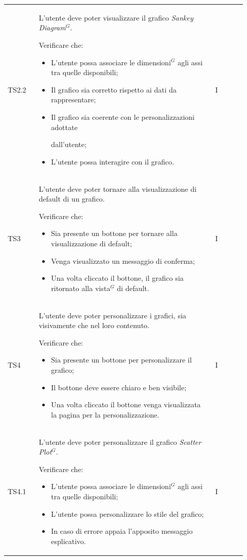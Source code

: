 \begin{longtable}{p{0.12\linewidth}p{0.68\linewidth}p{0.12\linewidth}}
    \rowcolor[RGB]{216, 235, 171}
    TS2.2 &
    L'utente deve poter visualizzare il grafico \textit{Sankey Diagram}$^{G}$.
    \par Verificare che:
    \begin{itemize}
        \item L'utente possa associare le dimensioni$^{G}$ agli assi tra quelle disponibili;
        \item Il grafico sia corretto rispetto ai dati da rappresentare;
        \item Il grafico sia coerente con le personalizzazioni adottate \par dall'utente;
        \item L'utente possa interagire con il grafico.
    \end{itemize}&
    I\\

    \rowcolor[RGB]{233, 245, 206}
    TS3 & 
    L'utente deve poter tornare alla visualizzazione di default di un grafico. \par 
    Verificare che:
    \begin{itemize}
        \item Sia presente un bottone per tornare alla visualizzazione di default;
        \item Venga visualizzato un messaggio di conferma;
        \item Una volta cliccato il bottone, il grafico sia ritornato alla vista$^{G}$ di default.
    \end{itemize}&
    I\\

    \rowcolor[RGB]{216, 235, 171}
    TS4 &
    L'utente deve poter personalizzare i grafici, sia visivamente che nel loro contenuto. \par
    Verificare che:
    \begin{itemize}
        \item Sia presente un bottone per personalizzare il grafico;
        \item Il bottone deve essere chiaro e ben visibile;
        \item Una volta cliccato il bottone venga visualizzata la pagina per la personalizzazione.
    \end{itemize}&
    I\\

    \rowcolor[RGB]{233, 245, 206}
    TS4.1 &
    L'utente deve poter personalizzare il grafico \textit{Scatter Plot}$^{G}$. \par
    Verificare che:
    \begin{itemize}
        \item L'utente possa associare le dimensioni$^{G}$ agli assi tra quelle disponibili;
        \item L'utente possa personalizzare lo stile del grafico;
        \item In caso di errore appaia l'apposito messaggio esplicativo.
    \end{itemize}&
    I \\


\end{longtable}
